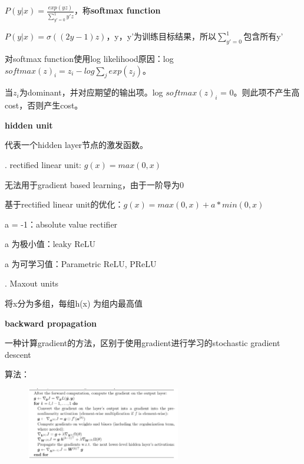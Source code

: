 \documentclass[UTF8]{ctexart}
\begin{document}
  \quad \quad $P (y | x) = \frac{exp(yz)}{\sum_{y' = 0}^{1} y'z } $，称\textbf{softmax function}

  \quad \quad $P (y | x) = \sigma ((2y - 1)z)$，y，y'为训练目标结果，所以$\sum_{y' = 0}^{1} $包含所有y'

  \quad 对softmax function使用log likelihood原因：log $softmax(z)_i = z_i - log\sum_j exp(z_j)$。

  \quad \quad 当$z_i$为dominant，并对应期望的输出项。log $softmax(z)_i$ = 0。则此项不产生高cost，否则产生cost。

  \textbf{hidden unit}

  \quad \quad 代表一个hidden layer节点的激发函数。

  \quad {}. rectified linear unit: $g(x) = max(0, x)$

  \quad \quad \quad 无法用于gradient based learning，由于一阶导为0

  \quad \quad \quad 基于rectified linear unit的优化：$g(x) = max(0, x) + a*min(0, x)$

  \quad \quad \quad \quad a = -1：absolute value rectifier

  \quad \quad \quad \quad a 为极小值：leaky ReLU

  \quad \quad \quad \quad a 为可学习值：Parametric ReLU, PReLU

  \quad {}. Maxout units

  \quad \quad \quad 将x分为多组，每组h(x) 为组内最高值

  \textbf{backward propagation}

  \quad 一种计算gradient的方法，区别于使用gradient进行学习的stochastic gradient descent

  \quad 算法：
  \begin{figure}[H] %
    \centering %
    \includegraphics[width=0.6\textwidth]{note_images/backprop_algo.png} %
  \end{figure}

  
\end{document}
